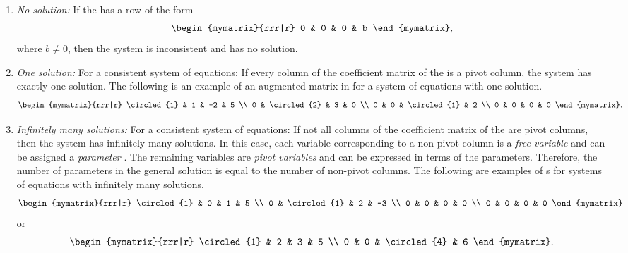 \begin{enumerate}
\item {\em No solution:} If the {\ef} has a row of the form
  \begin{equation*}
    \begin{mymatrix}{rrr|r}
      0 & 0 & 0 & b
    \end{mymatrix},
  \end{equation*}
  where $b\neq 0$, then the system is inconsistent and has no
  solution.

\item {\em One solution:} For a consistent system of equations: If
  every column of the coefficient matrix of the {\ef} is a pivot
  column, the system has exactly one solution. The following is an
  example of an augmented matrix in {\ef} for a system of equations
  with one solution.
  \begin{equation*}
    \begin{mymatrix}{rrr|r}
      \circled{1} & 1 & -2 & 5 \\
      0 & \circled{2} & 3 & 0 \\
      0 & 0 & \circled{1} & 2 \\
      0 & 0 & 0 & 0
    \end{mymatrix}.
  \end{equation*}

\item {\em Infinitely many solutions:} For a consistent system of
  equations: If not all columns of the coefficient matrix of the {\ef}
  are pivot columns, then the system has infinitely many solutions.
  In this case, each variable corresponding to a non-pivot column is a
  {\em free variable}%
   and can be assigned a {\em parameter}%
  . The remaining variables are {\em pivot
    variables}%
   and can be expressed in terms of the
  parameters. Therefore, the number of parameters in the general
  solution is equal to the number of non-pivot columns.  The following
  are examples of {\ef}s for systems of equations with infinitely many
  solutions.
  \begin{equation*}
    \begin{mymatrix}{rrr|r}
      \circled{1} & 0 & 1 & 5 \\
      0 & \circled{1} & 2 & -3 \\
      0 & 0 & 0 & 0 \\
      0 & 0 & 0 & 0
    \end{mymatrix}
  \end{equation*}
  or
  \begin{equation*}
    \begin{mymatrix}{rrr|r}
      \circled{1} & 2 & 3 & 5 \\
      0 & 0 & \circled{4} & 6
    \end{mymatrix}.
  \end{equation*}
\end{enumerate}

